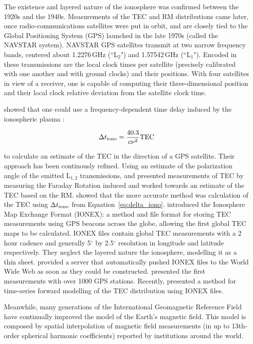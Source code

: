 The existence and layered nature of the ionosphere was confirmed between the 1920s and the 1940s. Measurements of the TEC and RM distributions came later, once radio-communications satellites were put in orbit, and are closely tied to the Global Positioning System (GPS) launched in the late 1970s (called the NAVSTAR system). NAVSTAR GPS satellites transmit at two narrow frequency bands, centered about 1.2276\,GHz (``L$_2$") and 1.57542\,GHz (``L$_1$"). Encoded in these transmissions are the local clock times per satellite (precisely calibrated with one another and with ground clocks) and their positions. With four satellites in view of a receiver, one is capable of computing their three-dimensional position and their local clock relative deviation from the satellite clock time. 

\cite{Macdoran.89} showed that one could use a frequency-dependent time delay induced by the ionospheric plasma \citep{Klobuchar.83, Brunner.93}:

\begin{equation}
\Delta t_{\rm iono} = \frac{40.3}{c\nu^2}{\rm TEC}
\label{eq:delta_iono}
\end{equation}

to calculate an estimate of the TEC in the direction of a GPS satellite. Their approach has been continously refined. 
Using an estimate of the polarization angle of the emitted L$_{1,2}$ transmissions, \cite{Titheridge.72} and \cite{Royden.84} presented measurements of TEC by measuring the Faraday Rotation induced and worked towards an estimate of the TEC based on the RM.
\cite{Lanyi.88} showed that the more accurate method was calculation of the TEC using $\Delta t_{\rm iono}$ from Equation~\ref{eq:delta_iono}.
\cite{Mannucci.98} introduced the Ionosphere Map Exchange Format (IONEX): a method and file format for storing TEC measurements using GPS beacons across the globe, allowing the first global TEC maps to be calculated. IONEX files contain global TEC measurements with a 2 hour cadence and generally 5$^\circ$ by 2.5$^\circ$ resolution in longitude and latitude respectively. They neglect the layered nature the ionosphere, modelling it as a thin sheet.
\cite{Iijima.99} provided a server that automatically pushed IONEX files to the World Wide Web as soon as they could be constructed.
\cite{Komjathy.05} presented the first measurements with over 1000 GPS stations.
Recently, \cite{Erdogan.16} presented a method for time-series forward modelling of the TEC distribution using IONEX files.

Meanwhile, many generations of the International Geomagnetic Reference Field \citep[IGRF][]{Finlay10} have continually improved the model of the Earth's magnetic field. This model is composed by spatial interpolation of magnetic field measurements (in up to 13th-order spherical harmonic coefficients) reported by institutions around the world.

